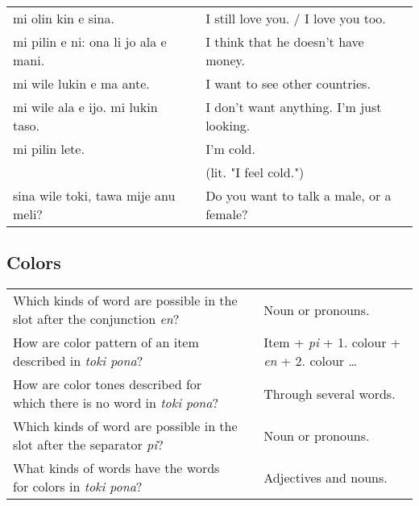 \begin{supertabular}{p{5,5cm}|ll}
mi olin kin e sina.  && I still love you. / I love you too.\\
mi pilin e ni: ona li jo ala e mani.  && I think that he doesn't have money. \\
mi wile lukin e ma ante.  && I want to see other countries. \\
mi wile ala e ijo. mi lukin taso.  && I don't want anything. I'm just looking. \\
mi pilin lete.  && I'm cold. \\
 &&   (lit. "I feel cold.") \\ %
sina wile toki, tawa mije anu meli?  && Do you want to talk a male, or a female? \\
\end{supertabular} 

\newpage
%
\subsection*{Colors} 
\label{'colors'}
%
\begin{supertabular}{p{5,5cm}|ll}
Which kinds of word are possible in the slot after the conjunction \textit{en}? && Noun or pronouns.  \\ %
How are color pattern of an item described in \textit{toki pona}? && Item + \textit{pi} + 1. colour + \textit{en} + 2. colour \dots \\ %
How are color tones described for which there is no word in \textit{toki pona}? && Through several words. \\ %
Which kinds of word are possible in the slot after the separator \textit{pi}? && Noun or pronouns.  \\ %
What kinds of words have the words for colors in \textit{toki pona}? && Adjectives and nouns. \\ %
\end{supertabular} 

